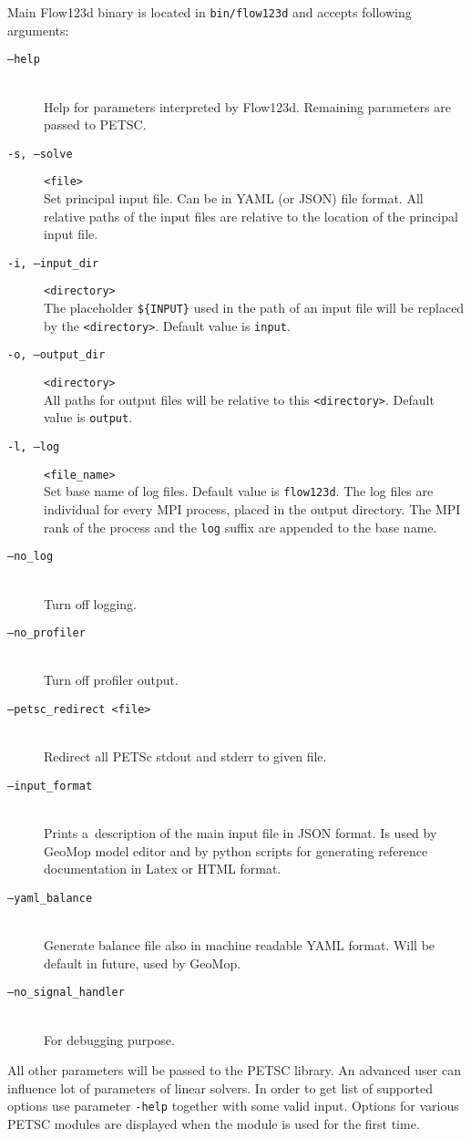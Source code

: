 Main Flow123d binary is located in \verb'bin/flow123d' and accepts following arguments:


\begin{description}
 \item[{\tt --help}] \hfill\\
        Help for parameters interpreted by Flow123d. Remaining parameters are passed to PETSC.
 \item[ {\tt -s, --solve} ] \verb'<file>' \hfill\\
 	 Set principal input file. Can be in YAML (or  JSON) file format. All relative paths of the input 
 	 files are relative to the location of the principal input file.
 \item[{\tt -i, --input\_dir}] \verb'<directory>' \hfill\\
 	The placeholder \verb"${INPUT}" %
  	used in the path of an input file will be replaced by the \verb'<directory>'. Default value is \verb'input'.
 \item[{\tt -o, --output\_dir}] \verb'<directory>' \hfill\\
 	All paths for output files will be relative to this \verb'<directory>'. Default value is \verb'output'.
 \item[{\tt -l, --log}] \verb'<file_name>' \hfill\\
 	Set base name of log files. Default value is \verb'flow123d'. The log files are individual for every MPI process, placed in the output directory. 
 	The MPI rank of the process and the \verb'log' suffix are appended to the base name.
 \item[{\tt --no\_log}] \hfill\\
        Turn off logging.
 \item[{\tt --no\_profiler}] \hfill\\
        Turn off profiler output.
 \item[{\tt --petsc\_redirect <file>}] \hfill\\
        Redirect all PETSc stdout and stderr to given file.       
 \item[{\tt --input\_format}] \hfill\\ 
        Prints a~description of the main input file in JSON format. Is used by GeoMop model editor and by python scripts for 
        generating reference documentation in Latex or HTML format.
 \item[{\tt --yaml\_balance}] \hfill\\
        Generate balance file also in machine readable YAML format. Will be default in future, used by GeoMop.
 \item[{\tt --no\_signal\_handler}] \hfill\\
        For debugging purpose.
        
\end{description}
All other parameters will be passed to the PETSC library. An advanced user can influence lot of parameters of linear solvers. In order to get list of supported options 
use parameter \verb'-help' together with some valid input. Options for various PETSC modules are displayed when the module is used for the first time.

